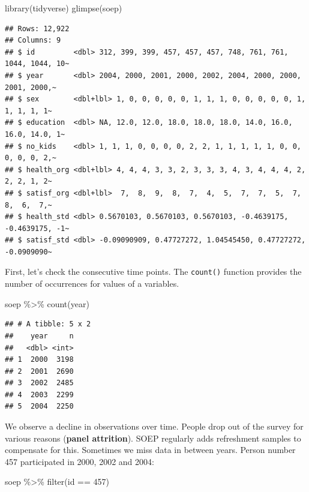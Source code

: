 \documentclass[
]{book}
\newenvironment{Shaded}{\begin{snugshade}}{\end{snugshade}}
\newcommand{\DecValTok}[1]{\textcolor[rgb]{0.00,0.00,0.81}{#1}}
\newcommand{\FunctionTok}[1]{\textcolor[rgb]{0.00,0.00,0.00}{#1}}
\newcommand{\NormalTok}[1]{#1}
\newcommand{\SpecialCharTok}[1]{\textcolor[rgb]{0.00,0.00,0.00}{#1}}
\begin{document}
\begin{Shaded}
\begin{Highlighting}[]
\FunctionTok{library}\NormalTok{(tidyverse)}
\FunctionTok{glimpse}\NormalTok{(soep)}
\end{Highlighting}
\end{Shaded}

\begin{verbatim}
## Rows: 12,922
## Columns: 9
## $ id         <dbl> 312, 399, 399, 457, 457, 457, 748, 761, 761, 1044, 1044, 10~
## $ year       <dbl> 2004, 2000, 2001, 2000, 2002, 2004, 2000, 2000, 2001, 2000,~
## $ sex        <dbl+lbl> 1, 0, 0, 0, 0, 0, 1, 1, 1, 0, 0, 0, 0, 0, 1, 1, 1, 1, 1~
## $ education  <dbl> NA, 12.0, 12.0, 18.0, 18.0, 18.0, 14.0, 16.0, 16.0, 14.0, 1~
## $ no_kids    <dbl> 1, 1, 1, 0, 0, 0, 0, 2, 2, 1, 1, 1, 1, 1, 0, 0, 0, 0, 0, 2,~
## $ health_org <dbl+lbl> 4, 4, 4, 3, 3, 2, 3, 3, 3, 4, 3, 4, 4, 4, 2, 2, 2, 1, 2~
## $ satisf_org <dbl+lbl>  7,  8,  9,  8,  7,  4,  5,  7,  7,  5,  7,  8,  6,  7,~
## $ health_std <dbl> 0.5670103, 0.5670103, 0.5670103, -0.4639175, -0.4639175, -1~
## $ satisf_std <dbl> -0.09090909, 0.47727272, 1.04545450, 0.47727272, -0.0909090~
\end{verbatim}

First, let's check the consecutive time points. The \texttt{count()} function provides the number of occurrences for values of a variables.

\begin{Shaded}
\begin{Highlighting}[]
\NormalTok{soep }\SpecialCharTok{\%\textgreater{}\%}
  \FunctionTok{count}\NormalTok{(year)}
\end{Highlighting}
\end{Shaded}

\begin{verbatim}
## # A tibble: 5 x 2
##    year     n
##   <dbl> <int>
## 1  2000  3198
## 2  2001  2690
## 3  2002  2485
## 4  2003  2299
## 5  2004  2250
\end{verbatim}

We observe a decline in observations over time. People drop out of the survey for various reasons (\textbf{panel attrition}). SOEP regularly adds refreshment samples to compensate for this. Sometimes we miss data in between years. Person number 457 participated in 2000, 2002 and 2004:

\begin{Shaded}
\begin{Highlighting}[]
\NormalTok{soep }\SpecialCharTok{\%\textgreater{}\%}
  \FunctionTok{filter}\NormalTok{(id }\SpecialCharTok{==} \DecValTok{457}\NormalTok{)}
\end{Highlighting}
\end{Shaded}
\end{document}
